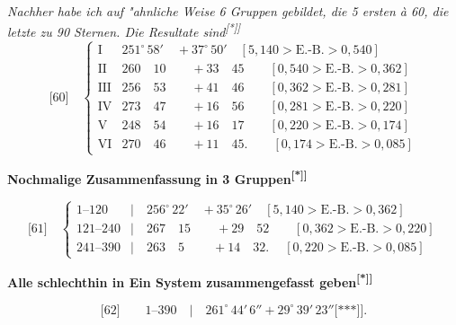 \documentclass[12pt,a4paper]{article}
\theoremstyle{plain}
\theoremstyle{definition}
\theoremstyle{remark}
\begin{document}
{{\itshape Nachher habe ich auf "ahnliche Weise 6 Gruppen gebildet, die 5 ersten \`a 60, die letzte zu 90 Sternen. Die Resultate sind\textsuperscript{[*]]}}
\[
\text{[60]}\quad
\left\{\begin{array}{lll}
\text{I}   & 251^{\circ}\,58' \quad +37^{\circ}\,50' \quad [5{,}140 > \text{E.-B.} > 0{,}540]\\
\text{II}  & 260\quad 10 \quad\quad +33\quad 45 \quad\quad [0{,}540 > \text{E.-B.} > 0{,}362]\\
\text{III} & 256\quad 53 \quad\quad +41\quad 46 \quad\quad [0{,}362 > \text{E.-B.} > 0{,}281]\\
\text{IV}  & 273\quad 47 \quad\quad +16\quad 56 \quad\quad [0{,}281 > \text{E.-B.} > 0{,}220]\\
\text{V}   & 248\quad 54 \quad\quad +16\quad 17 \quad\quad [0{,}220 > \text{E.-B.} > 0{,}174]\\
\text{VI}  & 270\quad 46 \quad\quad +11\quad 45. \quad\quad [0{,}174 > \text{E.-B.} > 0{,}085]
\end{array}\right.
\]

\vspace{1em}
\begin{center}
\textbf{Nochmalige Zusammenfassung in 3 Gruppen\textsuperscript{[*]]}}
\end{center}
\[
\text{[61]}\quad
\left\{\begin{array}{lll}
1\text{--}120   & |\quad 256^{\circ}\,22' \quad +35^{\circ}\,26' \quad [5{,}140 > \text{E.-B.} > 0{,}362]\\
121\text{--}240 & |\quad 267\quad 15 \quad\quad +29\quad 52 \quad\quad [0{,}362 > \text{E.-B.} > 0{,}220]\\
241\text{--}390 & |\quad 263\quad 5 \quad\quad\ +14\quad 32. \quad\ [0{,}220 > \text{E.-B.} > 0{,}085]
\end{array}\right.
\]

\vspace{1em}
\begin{center}
\textbf{Alle schlechthin in Ein System zusammengefasst geben\textsuperscript{[*]]}}
\end{center}
\[
\text{[62]}\qquad 1\text{--}390 \quad|\quad 261^{\circ}\,44'\,6'' + 29^{\circ}\,39'\,23''\text{[***]}].
\]

}
\end{document}

